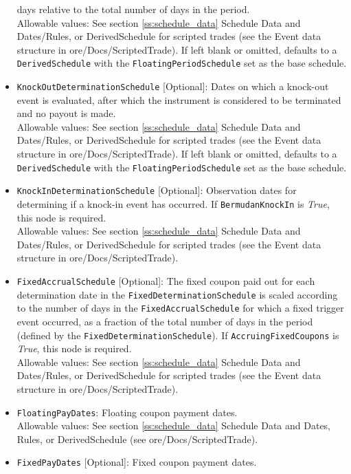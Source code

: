 \begin{itemize}
  days relative to the total number of days in the period. \\
    Allowable values: See section \ref{ss:schedule_data} Schedule Data and Dates/Rules, or
    DerivedSchedule for scripted trades (see the Event data structure in ore/Docs/ScriptedTrade).
    If left blank or omitted, defaults to a \lstinline!DerivedSchedule! with the
    \lstinline!FloatingPeriodSchedule! set as the base schedule.
  \item \lstinline!KnockOutDeterminationSchedule! [Optional]: Dates on which a knock-out
  event is evaluated, after which the instrument is considered to be terminated and no
  payout is made. \\
    Allowable values: See section \ref{ss:schedule_data} Schedule Data and Dates/Rules, or
    DerivedSchedule for scripted trades (see the Event data structure in ore/Docs/ScriptedTrade).
    If left blank or omitted, defaults to a \lstinline!DerivedSchedule! with the
    \lstinline!FloatingPeriodSchedule! set as the base schedule.
  \item \lstinline!KnockInDeterminationSchedule! [Optional]: Observation dates for
  determining if a knock-in event has occurred. If \lstinline!BermudanKnockIn!
  is \emph{True}, this node is required. \\
    Allowable values: See section \ref{ss:schedule_data} Schedule Data and Dates/Rules, or
    DerivedSchedule for scripted trades (see the Event data structure in ore/Docs/ScriptedTrade).
  \item \lstinline!FixedAccrualSchedule! [Optional]: The fixed coupon paid out for each determination date
  in the \lstinline!FixedDeterminationSchedule! is scaled according to the number of days
  in the \lstinline!FixedAccrualSchedule! for which a fixed trigger event occurred, as a fraction of
  the total number of days in the period (defined by the
  \lstinline!FixedDeterminationSchedule!). If \lstinline!AccruingFixedCoupons! is
  \emph{True}, this node is required. \\
    Allowable values: See section \ref{ss:schedule_data} Schedule Data and Dates/Rules, or
    DerivedSchedule for scripted trades (see the Event data structure in ore/Docs/ScriptedTrade).
  \item \lstinline!FloatingPayDates!: Floating coupon payment dates. \\
    Allowable values: See section \ref{ss:schedule_data} Schedule Data and Dates, Rules, or
    DerivedSchedule (see ore/Docs/ScriptedTrade).
  \item \lstinline!FixedPayDates! [Optional]: Fixed coupon payment dates. \\

\end{itemize}
